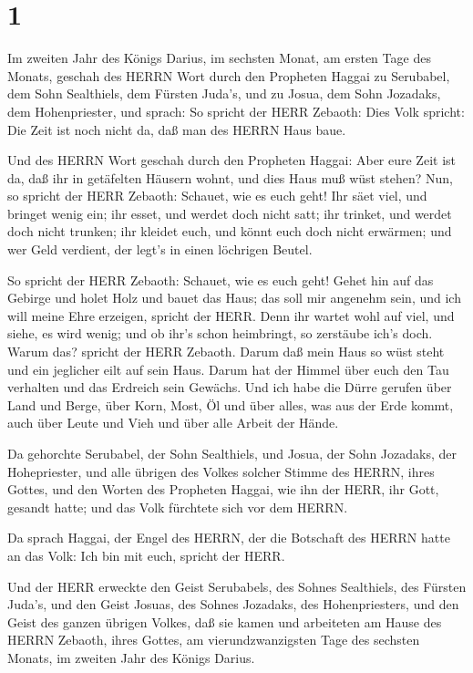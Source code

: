 \hypertarget{section}{%
\section{1}\label{section}}

 Im zweiten Jahr des Königs Darius, im sechsten Monat, am
ersten Tage des Monats, geschah des HERRN Wort durch den Propheten
Haggai zu Serubabel, dem Sohn Sealthiels, dem Fürsten Juda's, und zu
Josua, dem Sohn Jozadaks, dem Hohenpriester, und sprach:  So
spricht der HERR Zebaoth: Dies Volk spricht: Die Zeit ist noch nicht da,
daß man des HERRN Haus baue.

 Und des HERRN Wort geschah durch den Propheten Haggai:
 Aber eure Zeit ist da, daß ihr in getäfelten Häusern wohnt,
und dies Haus muß wüst stehen?  Nun, so spricht der HERR
Zebaoth: Schauet, wie es euch geht!  Ihr säet viel, und
bringet wenig ein; ihr esset, und werdet doch nicht satt; ihr trinket,
und werdet doch nicht trunken; ihr kleidet euch, und könnt euch doch
nicht erwärmen; und wer Geld verdient, der legt's in einen löchrigen
Beutel.

 So spricht der HERR Zebaoth: Schauet, wie es euch geht!
 Gehet hin auf das Gebirge und holet Holz und bauet das
Haus; das soll mir angenehm sein, und ich will meine Ehre erzeigen,
spricht der HERR.  Denn ihr wartet wohl auf viel, und siehe,
es wird wenig; und ob ihr's schon heimbringt, so zerstäube ich's doch.
Warum das? spricht der HERR Zebaoth. Darum daß mein Haus so wüst steht
und ein jeglicher eilt auf sein Haus.  Darum hat der Himmel
über euch den Tau verhalten und das Erdreich sein Gewächs. 
Und ich habe die Dürre gerufen über Land und Berge, über Korn, Most, Öl
und über alles, was aus der Erde kommt, auch über Leute und Vieh und
über alle Arbeit der Hände.

 Da gehorchte Serubabel, der Sohn Sealthiels, und Josua,
der Sohn Jozadaks, der Hohepriester, und alle übrigen des Volkes solcher
Stimme des HERRN, ihres Gottes, und den Worten des Propheten Haggai, wie
ihn der HERR, ihr Gott, gesandt hatte; und das Volk fürchtete sich vor
dem HERRN.

 Da sprach Haggai, der Engel des HERRN, der die Botschaft
des HERRN hatte an das Volk: Ich bin mit euch, spricht der HERR.

 Und der HERR erweckte den Geist Serubabels, des Sohnes
Sealthiels, des Fürsten Juda's, und den Geist Josuas, des Sohnes
Jozadaks, des Hohenpriesters, und den Geist des ganzen übrigen Volkes,
daß sie kamen und arbeiteten am Hause des HERRN Zebaoth, ihres Gottes,
 am vierundzwanzigsten Tage des sechsten Monats, im zweiten
Jahr des Königs Darius.


